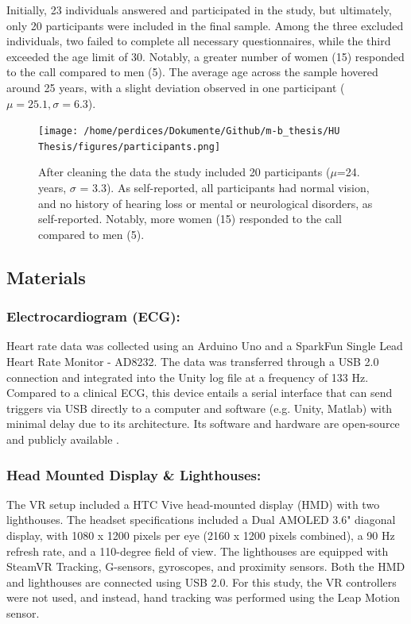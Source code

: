 \documentclass[12pt,oneside,openright]{report}
\begin{document}
Initially, 23 individuals answered and participated in the study, but ultimately, only 20 participants were included in the final sample. Among the three excluded individuals, two failed to complete all necessary questionnaires, while the third exceeded the age limit of 30. Notably, a greater number of women (15) responded to the call compared to men (5). The average age across the sample hovered around 25 years, with a slight deviation observed in one participant ($\mu=25.1, \sigma=6.3$).

\begin{figure}[h]
    \centering
    \texttt{[image: /home/perdices/Dokumente/Github/m-b\_thesis/HU Thesis/figures/participants.png]}
    \caption{After cleaning the data the study included 20 participants (\(\mu\)=24. years, \(\sigma\) = 3.3). As self-reported, all participants had normal vision, and no history of hearing loss or mental or neurological disorders, as self-reported. Notably, more women (15) responded to the call compared to men (5).}
    \label{fig:mesh1}
\end{figure}

    
\subsection*{Materials}

\subsubsection*{Electrocardiogram (ECG):}
Heart rate data was collected using an Arduino Uno and a SparkFun Single Lead Heart Rate Monitor - AD8232. The data was transferred through a USB 2.0 connection and integrated into the Unity log file at a frequency of 133 Hz. Compared to a clinical ECG, this device entails a serial interface that can send triggers via USB directly to a computer and software (e.g. Unity, Matlab) with minimal delay due to its architecture. Its software and hardware are open-source and publicly available \parencite{TimsECG}.

\subsubsection*{Head Mounted Display \& Lighthouses:}
The VR setup included a HTC Vive head-mounted display (HMD) with two lighthouses. The headset specifications included a Dual AMOLED 3.6" diagonal display, with 1080 x 1200 pixels per eye (2160 x 1200 pixels combined), a 90 Hz refresh rate, and a 110-degree field of view. The lighthouses are equipped with SteamVR Tracking, G-sensors, gyroscopes, and proximity sensors. Both the HMD and lighthouses are connected using USB 2.0. For this study, the VR controllers were not used, and instead, hand tracking was performed using the Leap Motion sensor.
\end{document}
